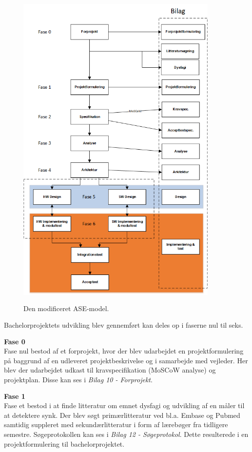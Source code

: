 \begin{figure}[H]
\centering
{\includegraphics[width=10cm]
{Figure/procesVoresASE}}
\caption{Den modificeret ASE-model.}
\label{fig:procesVoresASE}
\end{figure}

Bachelorprojektets udvikling blev gennemført kan deles op i faserne nul til seks. 

\textbf{Fase 0}\\
Fase nul bestod af et forprojekt, hvor der blev udarbejdet en projektformulering på baggrund af en udleveret projektbeskrivelse og i samarbejde med vejleder. Her blev der udarbejdet udkast til kravspecifikation (MoSCoW analyse) og projektplan. Disse kan ses i \textit{Bilag 10 - Forprojekt}.

\textbf{Fase 1}\\
Fase et bestod i at finde litteratur om emnet dysfagi og udvikling af en måler til at detektere synk. Der blev søgt primærlitteratur ved bl.a. Embase og Pubmed samtidig suppleret med sekundærlitteratur i form af lærebøger fra tidligere semestre. Søgeprotokollen kan ses i \textit{Bilag 12 - Søgeprotokol}. Dette resulterede i en projektformulering til bachelorprojektet.

